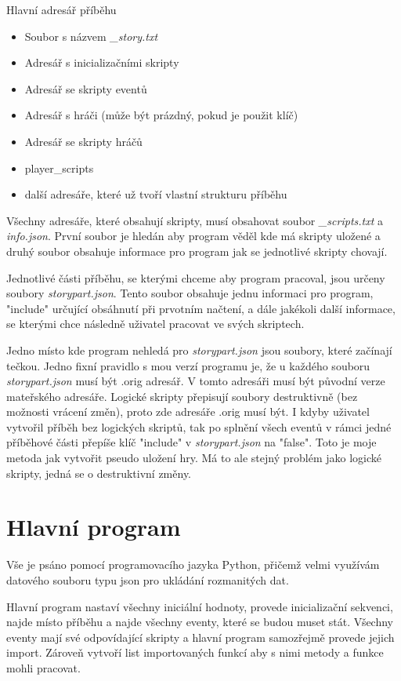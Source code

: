 \documentclass[12pt,a4paper]{article}
\begin{document}
Hlavní adresář příběhu
\begin{itemize}
	\item Soubor s názvem \textit{\_story.txt}
	\item Adresář s inicializačními skripty
	\item Adresář se skripty eventů
	\item Adresář s hráči (může být prázdný, pokud je použit klíč)
	\item Adresář se skripty hráčů 
	\item player\_scripts
	\item další adresáře, které už tvoří vlastní strukturu příběhu
\end{itemize}

Všechny adresáře, které obsahují skripty, musí obsahovat soubor \textit{\_scripts.txt} a \textit{info.json}. První soubor je hledán aby program věděl kde má skripty uložené a druhý soubor obsahuje informace pro program jak se jednotlivé skripty chovají.

Jednotlivé části příběhu, se kterými chceme aby program pracoval, jsou určeny soubory \textit{storypart.json}. Tento soubor obsahuje jednu informaci pro program, "include" určující obsáhnutí při prvotním načtení, a dále jakékoli další informace, se kterými chce následně uživatel pracovat ve svých skriptech.

Jedno místo kde program nehledá pro \textit{storypart.json} jsou soubory, které začínají tečkou. Jedno fixní pravidlo s mou verzí programu je, že u každého souboru \textit{storypart.json} musí být .orig adresář. V tomto adresáři musí být původní verze mateřského adresáře. Logické skripty přepisují soubory destruktivně (bez možnosti vrácení změn), proto zde adresáře .orig musí být. I kdyby uživatel vytvořil příběh bez logických skriptů, tak po splnění všech eventů v rámci jedné příběhové části přepíše klíč "include" v \textit{storypart.json} na "false". Toto je moje metoda jak vytvořit pseudo uložení hry. Má to ale stejný problém jako logické skripty, jedná se o destruktivní změny.


\section{Hlavní program}
Vše je psáno pomocí programovacího jazyka Python, přičemž velmi využívám datového souboru typu json pro ukládání rozmanitých dat.

Hlavní program nastaví všechny iniciální hodnoty, provede inicializační sekvenci, najde místo příběhu a najde všechny eventy, které se budou muset stát. Všechny eventy mají své odpovídající skripty a hlavní program samozřejmě provede jejich import. Zároveň vytvoří list importovaných funkcí aby s nimi metody a funkce mohli pracovat.
\end{document}
